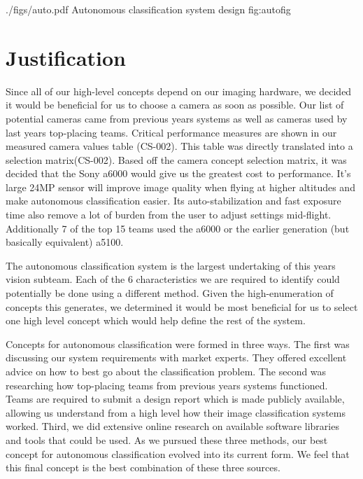 \documentclass[]{auvsi_doc}
\begin{document}
\AUVSIFigure
{./figs/auto.pdf}
{\textwidth}
{Autonomous classification system design}
{fig:autofig}

\section{Justification}

Since all of our high-level concepts depend on our imaging hardware, we decided it would be beneficial for us to choose a camera as soon as possible. Our list of potential cameras came from previous years systems as well as cameras used by last years top-placing teams. Critical performance measures are shown in our measured camera values table (CS-002). This table was directly translated into a selection matrix(CS-002). Based off the camera concept selection matrix, it was decided that the Sony a6000 would give us the greatest cost to performance. It's large 24MP sensor will improve image quality when flying at higher altitudes and make autonomous classification easier. Its auto-stabilization and fast exposure time also remove a lot of burden from the user to adjust settings mid-flight. Additionally 7 of the top 15 teams used the a6000 or the earlier generation (but basically equivalent) a5100.

The autonomous classification system is the largest undertaking of this years vision subteam. Each of the 6 characteristics we are required to identify could potentially be done using a different method. Given the high-enumeration of concepts this generates, we determined it would be most beneficial for us to select one high level concept which would help define the rest of the system.

Concepts for autonomous classification were formed in three ways. The first was discussing our system requirements with market experts. They offered excellent advice on how to best go about the classification problem. The second was researching how top-placing teams from previous years systems functioned. Teams are required to submit a design report which is made publicly available, allowing us understand from a high level how their image classification systems worked. Third, we did extensive online research on available software libraries and tools that could be used. As we pursued these three methods, our best concept for autonomous classification evolved into its current form. We feel that this final concept is the best combination of these three sources.
\end{document}
